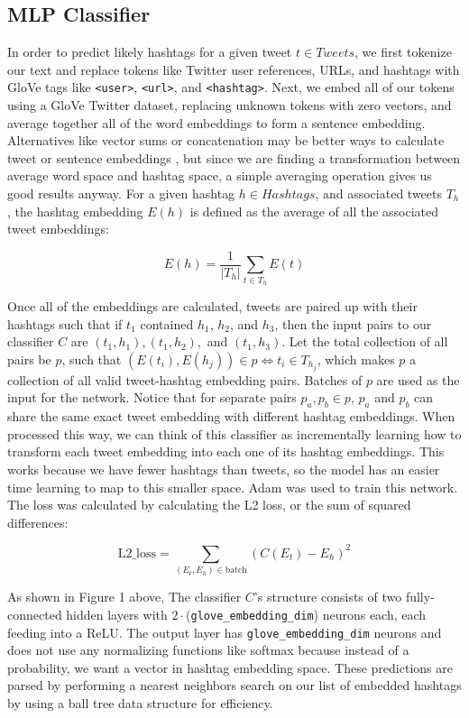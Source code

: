 \documentclass{article}
\begin{document}
	\subsection{MLP Classifier}
		In order to predict likely hashtags for a given tweet $t \in Tweets$, we first
		tokenize our text and replace tokens like Twitter user references, URLs, and
		hashtags with GloVe tags like \verb|<user>|, \verb|<url>|, and \verb|<hashtag>|.
		Next, we embed all of our tokens using a GloVe Twitter dataset, replacing
		unknown tokens with zero vectors, and average together all of the word embeddings
		to form a sentence embedding. Alternatives like vector sums or concatenation
		may be better ways to calculate tweet or sentence embeddings \parencite{Garten2015}, but since we are finding
		a transformation between average word space and hashtag space, a simple averaging
		operation gives us good results anyway. For a given hashtag $h \in Hashtags$, and associated tweets
		$T_h$, the hashtag embedding $E(h)$ is defined as the average of all the associated
		tweet embeddings:

		$$E(h) = \frac{1}{|T_h|}\sum_{t\in T_h} E(t)$$

		Once all of the embeddings are calculated, tweets are paired up with their hashtags
		such that if $t_1$ contained $h_1$, $h_2$, and $h_3$, then the input pairs to our
		classifier $C$ are $(t_1, h_1), (t_1, h_2),$ and $(t_1, h_3)$. Let the total collection of
		all pairs be $p$, such that $\left(E(t_i), E(h_j)\right)\in p \Leftrightarrow t_i\in T_{h_j}$,
		which makes $p$ a collection of all valid tweet-hashtag embedding pairs. Batches of $p$ are used
		as the input for the network. Notice that for separate pairs $p_a, p_b \in p$, $p_a$ and $p_b$
		can share the same exact tweet embedding with different hashtag embeddings. When processed
		this way, we can think of this classifier as incrementally learning how to transform each
		tweet embedding into each one of its hashtag embeddings. This works because we have fewer
		hashtags than tweets, so the model has an easier time learning to map to this smaller space.
		Adam \parencite{Kingma2014} was used to train this network. The loss was calculated by
		calculating the L2 loss, or the sum of squared differences:

		 $$\text{L2\_loss} = \sum_{(E_t, E_h)\in \text{batch}} \left(C(E_t) - E_h\right)^2$$

		As shown in Figure 1 above,
		The classifier $C$'s structure consists of two fully-connected hidden layers with
		$2\cdot$(\verb|glove_embedding_dim|) neurons each, each feeding into a ReLU. The output
		layer has \verb|glove_embedding_dim| neurons and does not use any normalizing
		functions like softmax because instead of a probability, we want a vector in hashtag
		embedding space. These predictions are parsed by performing a nearest neighbors search
		on our list of embedded hashtags by using a ball tree data structure for efficiency.
\end{document}
